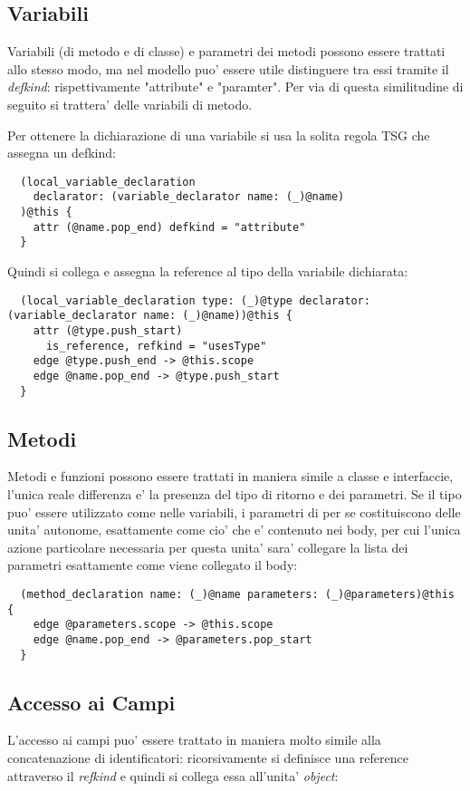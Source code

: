 \subsection{Variabili}

Variabili (di metodo e di classe) e parametri dei metodi possono essere trattati allo stesso modo, ma nel modello puo' essere utile distinguere tra essi tramite il \emph{defkind}: rispettivamente "attribute" e "paramter".
Per via di questa similitudine di seguito si trattera' delle variabili di metodo.

Per ottenere la dichiarazione di una variabile si usa la solita regola TSG che assegna un defkind:

\begin{lstlisting}
  (local_variable_declaration
    declarator: (variable_declarator name: (_)@name)
  )@this {
    attr (@name.pop_end) defkind = "attribute"
  }
\end{lstlisting}

Quindi si collega e assegna la reference al tipo della variabile dichiarata:

\begin{lstlisting}
  (local_variable_declaration type: (_)@type declarator: (variable_declarator name: (_)@name))@this {
    attr (@type.push_start)
      is_reference, refkind = "usesType"
    edge @type.push_end -> @this.scope
    edge @name.pop_end -> @type.push_start
  }
\end{lstlisting}

\subsection{Metodi}

Metodi e funzioni possono essere trattati in maniera simile a classe e interfaccie, l'unica reale differenza e' la presenza del tipo di ritorno e dei parametri.
Se il tipo puo' essere utilizzato come nelle variabili, i parametri di per se costituiscono delle unita' autonome, esattamente come cio' che e' contenuto nei body, per cui l'unica azione particolare necessaria per questa unita' sara' collegare la lista dei parametri esattamente come viene collegato il body:

\begin{lstlisting}
  (method_declaration name: (_)@name parameters: (_)@parameters)@this {
    edge @parameters.scope -> @this.scope
    edge @name.pop_end -> @parameters.pop_start
  }
\end{lstlisting}

\subsection{Accesso ai Campi}
L'accesso ai campi puo' essere trattato in maniera molto simile alla concatenazione di identificatori: ricorsivamente si definisce una reference attraverso il \emph{refkind} e quindi si collega essa all'unita' \emph{object}:

